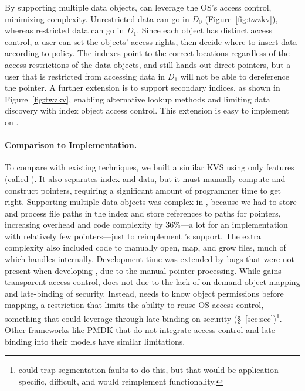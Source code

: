 {    By supporting multiple data objects, \nvkv can leverage the OS's access control,
    minimizing complexity. Unrestricted data can go in $D_0$ (Figure~\ref{fig:twzkv}),
    whereas restricted data can go in $D_1$. Since each object has distinct
    access control, a user can set the objects' access rights, then decide
    where to insert data according to policy. The indexes point to the
    correct locations regardless of the access restrictions of the data objects, and \nvkv still hands
    out direct pointers, but a user that is restricted from accessing data in $D_1$ will not
    be able to dereference the pointer. A further extension is to support secondary indices, as shown in
    Figure~\ref{fig:twzkv}, enabling alternative lookup methods and limiting data discovery
    with index object access control. This extension is easy to implement on \Twizzler.

    \paragraph{Comparison to \unix Implementation.} To compare with existing techniques, we built a
    similar KVS using only \unix features (called \unixkv). It also separates index and data, but it
    must manually compute and construct pointers, requiring a significant amount of programmer time to
    get right.
    Supporting multiple data objects was complex in \unixkv, because we had to store and process file
    paths in the index and store references to paths for pointers, increasing overhead and code
    complexity by 36\%---a lot for an implementation with relatively few pointers---just to reimplement
    \Twizzler's support. The extra complexity also included code to manually open, map, and
    grow files, much of which \Twizzler handles internally. Development time was extended by
    bugs that were not present when developing \nvkv, due to the manual pointer processing.  While \nvkv
    gains transparent access control, \unixkv does not due to the lack of
    on-demand object mapping and late-binding of security. Instead, \unixkv needs to know object permissions before
    mapping,
    a restriction that limits the ability to reuse OS access control, something that
    \nvkv could leverage through late-binding on security (\S~\ref{sec:sec})\footnote{\unixkv could trap segmentation faults to do this, but that would be
        application-specific, difficult, and would reimplement \Twizzler functionality.}. Other frameworks like PMDK
    that do not integrate access control and late-binding into their models have similar
    limitations.


}
